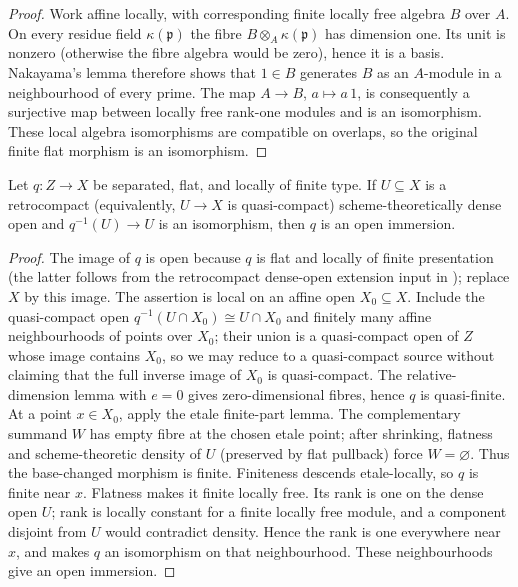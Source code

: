 \begin{proof}
  Work affine locally, with corresponding finite locally free algebra $B$ over
  $A$.  On every residue field $\kappa(\mathfrak p)$ the fibre
  $B\otimes_A\kappa(\mathfrak p)$ has dimension one.  Its unit is nonzero
  (otherwise the fibre algebra would be zero), hence it is a basis.  Nakayama's
  lemma therefore shows that $1\in B$ generates $B$ as an $A$-module in a
  neighbourhood of every prime.  The map $A\to B$, $a\mapsto a\,1$, is
  consequently a surjective map between locally free rank-one modules and is
  an isomorphism.  These local algebra isomorphisms are compatible on
  overlaps, so the original finite flat morphism is an isomorphism.
\end{proof}

\begin{lemma}
  \label{lemma:nagata-flat-strict-transform-open}

  Let $q\colon Z\to X$ be separated, flat, and locally of finite type.  If
  $U\subseteq X$ is a retrocompact (equivalently, $U\to X$ is
  quasi-compact) scheme-theoretically dense open and
  $q^{-1}(U)\to U$ is an isomorphism, then $q$ is an open immersion.
\end{lemma}

\begin{proof}
  The image of $q$ is open because $q$ is flat and locally of finite
  presentation (the latter follows from the retrocompact dense-open extension
  input in ); replace
  $X$ by this image.  The assertion is local on an affine open
  $X_0\subseteq X$.  Include the quasi-compact open
  $q^{-1}(U\cap X_0)\cong U\cap X_0$ and finitely many affine neighbourhoods
  of points over $X_0$; their union is a quasi-compact open of $Z$ whose image
  contains $X_0$, so we may reduce to a quasi-compact source without claiming
  that the full inverse image of $X_0$ is quasi-compact.  The
  relative-dimension lemma with
  $e=0$ gives zero-dimensional fibres, hence $q$ is quasi-finite.  At a point
  $x\in X_0$, apply the etale finite-part lemma.  The complementary summand
  $W$ has empty fibre at the chosen etale point; after shrinking, flatness and
  scheme-theoretic density of $U$ (preserved by flat pullback) force $W=\varnothing$.
  Thus the base-changed morphism is finite.  Finiteness descends etale-locally,
  so $q$ is finite near $x$.  Flatness makes it finite locally free.  Its
  rank is one on the dense open $U$; rank is locally constant for a finite
  locally free module, and a component disjoint from $U$ would contradict
  density.  Hence the rank is one everywhere near $x$, and
   makes $q$ an isomorphism on
  that neighbourhood.  These neighbourhoods give an open immersion.
\end{proof}

